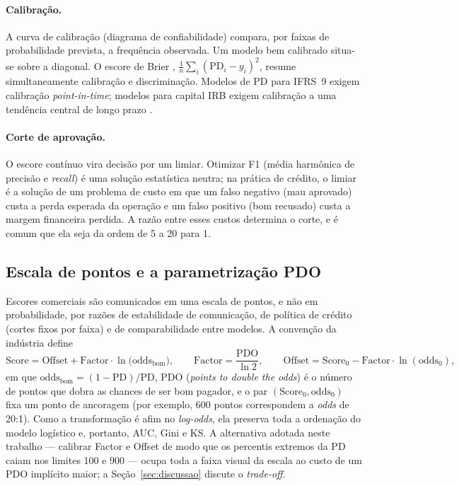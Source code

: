 \documentclass[11pt,a4paper]{article}
\newcommand{\pd}{\mathrm{PD}}
\begin{document}
\paragraph{Calibração.} A curva de calibração (diagrama de confiabilidade) compara, por faixas de probabilidade prevista, a frequência observada. Um modelo bem calibrado situa-se sobre a diagonal. O escore de Brier \citep{brier1950}, $\frac1n\sum_i(\pd_i-y_i)^2$, resume simultaneamente calibração e discriminação. Modelos de PD para IFRS~9 exigem calibração \emph{point-in-time}; modelos para capital IRB exigem calibração a uma tendência central de longo prazo \citep{bcbs2005}.

\paragraph{Corte de aprovação.} O escore contínuo vira decisão por um limiar. Otimizar F1 (média harmônica de precisão e \emph{recall}) é uma solução estatística neutra; na prática de crédito, o limiar é a solução de um problema de custo em que um falso negativo (mau aprovado) custa a perda esperada da operação e um falso positivo (bom recusado) custa a margem financeira perdida. A razão entre esses custos determina o corte, e é comum que ela seja da ordem de 5 a 20 para 1.

\subsection{Escala de pontos e a parametrização PDO}
\label{sec:pdo}

Escores comerciais são comunicados em uma escala de pontos, e não em probabilidade, por razões de estabilidade de comunicação, de política de crédito (cortes fixos por faixa) e de comparabilidade entre modelos. A convenção da indústria \citep{siddiqi2017,anderson2007,thomas2002} define
\begin{equation}
\mathrm{Score} = \mathrm{Offset} + \mathrm{Factor}\cdot \ln\!\big(\mathrm{odds}_{\text{bom}}\big),\qquad
\mathrm{Factor}=\frac{\mathrm{PDO}}{\ln 2},\qquad
\mathrm{Offset}=\mathrm{Score}_0-\mathrm{Factor}\cdot\ln(\mathrm{odds}_0),
\label{eq:pdo}
\end{equation}
em que $\mathrm{odds}_{\text{bom}}=(1-\pd)/\pd$, PDO (\emph{points to double the odds}) é o número de pontos que dobra as chances de ser bom pagador, e o par $(\mathrm{Score}_0,\mathrm{odds}_0)$ fixa um ponto de ancoragem (por exemplo, 600 pontos correspondem a \emph{odds} de 20:1). Como a transformação é afim no \emph{log-odds}, ela preserva toda a ordenação do modelo logístico e, portanto, AUC, Gini e KS. A alternativa adotada neste trabalho --- calibrar Factor e Offset de modo que os percentis extremos da PD caiam nos limites 100 e 900 --- ocupa toda a faixa visual da escala ao custo de um PDO implícito maior; a Seção~\ref{sec:discussao} discute o \emph{trade-off}.
\end{document}
